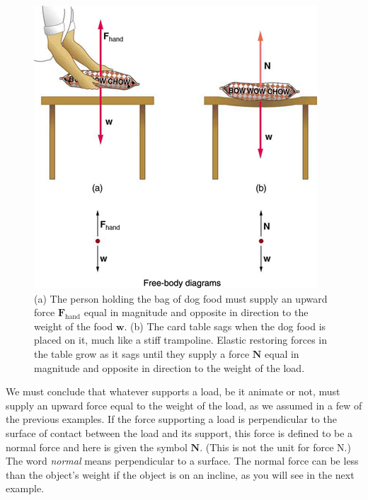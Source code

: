 \documentclass[
]{book}
\begin{document}
\begin{figure}
\hypertarget{import-auto-id2672874}{%
\centering
\includegraphics{images/Figure_04_05_01.jpg}
\caption{(a) The person holding the bag of dog food must supply an upward force
\(\textbf{F}_{\text{hand}}{}\) equal in magnitude and opposite in
direction to the weight of the food \(\textbf{w}{}\). (b) The card table
sags when the dog food is placed on it, much like a stiff trampoline.
Elastic restoring forces in the table grow as it sags until they supply
a force \(\textbf{N}{}\) equal in magnitude and opposite in direction to
the weight of the
load.}\label{import-auto-id2672874}
}
\end{figure}

We must conclude that whatever supports a load, be it animate or not,
must supply an upward force equal to the weight of the load, as we
assumed in a few of the previous examples. If the force supporting a
load is perpendicular to the surface of contact between the load and its
support, this force is defined to be a \protect\hypertarget{import-auto-id1254224}{}{normal
force}\textbf{} and here is given
the symbol \(\textbf{N}{}\). (This is not the unit for force N.) The word
\emph{normal} means perpendicular to a surface.
The normal force can be less than the object's weight if the object is
on an incline, as you will see in the next example.
\end{document}
